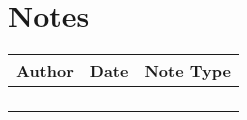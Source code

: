 \documentclass[qipps.tex]{subfiles}
\begin{document}
\section{Notes}
\begin{tabu} to 170mm {|X[1,l]|X[0.5,l]|X[1.5,l]|} \hline
Author & Date & Note Type  \\ \hline
   &   &   \\ \hline
   &   &   \\ \hline
   &   &   \\ \hline
   &   &   \\ \hline
\end{tabu}
\end{document}

